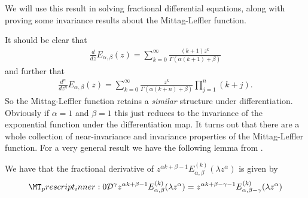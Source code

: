 We will use this result in solving fractional differential equations, along with proving some invariance results about the Mittag-Leffler function.

It should be clear that
\begin{align*}
    \frac{d}{dz}E_{\alpha, \beta}(z) = \sum_{k=0}^\infty \frac{(k+1)z^k}{\Gamma(\alpha(k+1) + \beta)}
\end{align*}
and further that
\begin{align}
    \label{eq:mit_int_der}
    \frac{d^n}{dz^n} E_{\alpha, \beta}(z) = \sum_{k=0}^\infty \frac{z^k}{\Gamma(\alpha(k+n)+\beta)}\prod_{j=1}^n(k+j).
\end{align}
So the Mittag-Leffler function retains a \emph{similar} structure under differentiation. Obviously if $ \alpha = 1 $ and $ \beta = 1 $ this just reduces to the invariance of the exponential function under the differentiation map. It turns out that there are a whole collection of near-invariance and invariance properties of the Mittag-Leffler function. For a very general result we have the following lemma from \cite{Podlubny1999}.
\begin{mdframed}[innertopmargin=10pt]
\begin{lemma}
    \label{lem:rld_mittag}
    We have that the fractional derivative of $ z^{\alpha k+\beta-1}E_{\alpha,\beta}^{(k)}(\lambda z^\alpha) $ is given by 
    \begin{align*}
        \prescript{}{0}{\mathcal{D}}^\gamma z^{\alpha k+\beta-1}E_{\alpha,\beta}^{(k)}(\lambda z^\alpha) = z^{\alpha k + \beta - \gamma - 1 } E_{\alpha,\beta-\gamma}^{(k)}(\lambda z^\alpha)
    \end{align*}
\end{lemma}
\end{mdframed}
